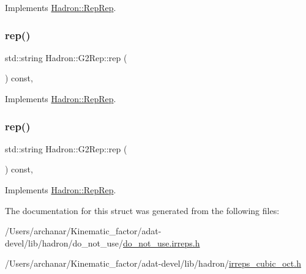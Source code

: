 Implements \mbox{\hyperlink{structHadron_1_1RepRep_ab3213025f6de249f7095892109575fde}{Hadron\+::\+Rep\+Rep}}.

\mbox{\label{structHadron_1_1G2Rep_aa186588eb9d24c8e3ecad3496a16225a}} 
\subsubsection{\texorpdfstring{rep()}{rep()}\hspace{0.1cm}{\footnotesize\ttfamily [4/5]}}
{\footnotesize\ttfamily std\+::string Hadron\+::\+G2\+Rep\+::rep (\begin{DoxyParamCaption}{ }\end{DoxyParamCaption}) const\hspace{0.3cm}{\ttfamily [inline]}, {\ttfamily [virtual]}}



Implements \mbox{\hyperlink{structHadron_1_1RepRep_ab3213025f6de249f7095892109575fde}{Hadron\+::\+Rep\+Rep}}.

\mbox{\label{structHadron_1_1G2Rep_aa186588eb9d24c8e3ecad3496a16225a}} 
\subsubsection{\texorpdfstring{rep()}{rep()}\hspace{0.1cm}{\footnotesize\ttfamily [5/5]}}
{\footnotesize\ttfamily std\+::string Hadron\+::\+G2\+Rep\+::rep (\begin{DoxyParamCaption}{ }\end{DoxyParamCaption}) const\hspace{0.3cm}{\ttfamily [inline]}, {\ttfamily [virtual]}}



Implements \mbox{\hyperlink{structHadron_1_1RepRep_ab3213025f6de249f7095892109575fde}{Hadron\+::\+Rep\+Rep}}.



The documentation for this struct was generated from the following files\+:\begin{DoxyCompactItemize}
\item 
/\+Users/archanar/\+Kinematic\+\_\+factor/adat-\/devel/lib/hadron/do\+\_\+not\+\_\+use/\mbox{\hyperlink{adat-devel_2lib_2hadron_2do__not__use_2do__not__use_8irreps_8h}{do\+\_\+not\+\_\+use.\+irreps.\+h}}\item 
/\+Users/archanar/\+Kinematic\+\_\+factor/adat-\/devel/lib/hadron/\mbox{\hyperlink{adat-devel_2lib_2hadron_2irreps__cubic__oct_8h}{irreps\+\_\+cubic\+\_\+oct.\+h}}\end{DoxyCompactItemize}
